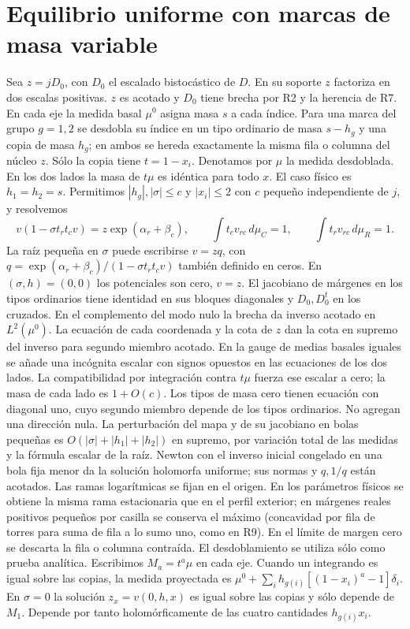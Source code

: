 \section{Equilibrio uniforme con marcas de masa variable}
Sea $z=jD_0$, con $D_0$ el escalado bistocástico de $D$. En su soporte $z$ factoriza
en dos escalas positivas. $z$ es acotado y $D_0$ tiene brecha por R2 y la herencia de R7.
En cada eje la medida basal $\mu^0$ asigna masa $s$ a cada índice. Para una marca del
grupo $g=1,2$ se desdobla su índice en un tipo ordinario de masa $s-h_g$ y una copia
de masa $h_g$; en ambos se hereda exactamente la misma fila o columna del núcleo $z$.
Sólo la copia tiene $t=1-x_i$. Denotamos por $\mu$ la medida desdoblada.
En los dos lados la masa de $t\mu$ es idéntica para todo $x$.
El caso físico es $h_1=h_2=s$. Permitimos $|h_g|,|\sigma|\le c$ y $|x_i|\le2$
con $c$ pequeño independiente de $j$, y resolvemos
\[
 v(1-\sigma t_r t_c v)=z\exp(\alpha_r+\beta_c),\qquad
 \int t_c v_{rc}\,d\mu_C=1,\qquad \int t_r v_{rc}\,d\mu_R=1 .
\]
La raíz pequeña en $\sigma$ puede escribirse $v=zq$, con
$q=\exp(\alpha_r+\beta_c)/(1-\sigma t_rt_c v)$ también definido en ceros.
En $(\sigma,h)=(0,0)$ los potenciales son cero, $v=z$.
El jacobiano de márgenes en los tipos ordinarios tiene identidad en sus bloques diagonales
y $D_0,D_0^t$ en los cruzados. En el complemento del modo nulo la brecha da inverso
acotado en $L^2(\mu^0)$. La ecuación de cada coordenada y la cota de $z$ dan la cota en
supremo del inverso para segundo miembro acotado. En la gauge de medias basales iguales
se añade una incógnita escalar con signos opuestos en las ecuaciones de los dos lados.
La compatibilidad por integración contra $t\mu$ fuerza ese escalar a cero; la masa de
cada lado es $1+O(c)$. Los tipos de masa cero tienen ecuación con diagonal uno, cuyo
segundo miembro depende de los tipos ordinarios. No agregan una dirección nula.
La perturbación del mapa y de su jacobiano en bolas pequeñas es $O(|\sigma|+|h_1|+|h_2|)$
en supremo, por variación total de las medidas y la fórmula escalar de la raíz.
Newton con el inverso inicial congelado en una bola fija menor da la solución holomorfa
uniforme; sus normas y $q,1/q$ están acotados. Las ramas logarítmicas se fijan en el origen.
En los parámetros físicos se obtiene la misma rama estacionaria que en el perfil exterior;
en márgenes reales positivos pequeños por casilla se conserva el máximo (concavidad por fila
de torres para suma de fila a lo sumo uno, como en R9). En el límite de margen cero se
descarta la fila o columna contraída. El desdoblamiento se utiliza sólo como prueba analítica.
Escribimos $M_a=t^a\mu$ en cada eje. Cuando un integrando es igual sobre las copias,
la medida proyectada es $\mu^0+\sum_i h_{g(i)}[(1-x_i)^a-1]\delta_i$.
En $\sigma=0$ la solución $z_x=v(0,h,x)$ es igual sobre las copias y sólo depende de $M_1$.
Depende por tanto holomórficamente de las cuatro cantidades $h_{g(i)}x_i$.
